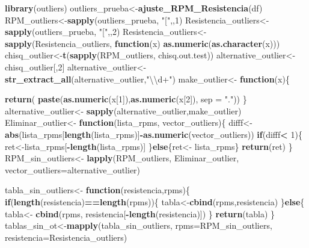 \documentclass[]{article}
\newenvironment{Shaded}{\begin{snugshade}}{\end{snugshade}}
\newcommand{\KeywordTok}[1]{\textcolor[rgb]{0.13,0.29,0.53}{\textbf{#1}}}
\newcommand{\DataTypeTok}[1]{\textcolor[rgb]{0.13,0.29,0.53}{#1}}
\newcommand{\DecValTok}[1]{\textcolor[rgb]{0.00,0.00,0.81}{#1}}
\newcommand{\CharTok}[1]{\textcolor[rgb]{0.31,0.60,0.02}{#1}}
\newcommand{\StringTok}[1]{\textcolor[rgb]{0.31,0.60,0.02}{#1}}
\newcommand{\ControlFlowTok}[1]{\textcolor[rgb]{0.13,0.29,0.53}{\textbf{#1}}}
\newcommand{\OperatorTok}[1]{\textcolor[rgb]{0.81,0.36,0.00}{\textbf{#1}}}
\newcommand{\NormalTok}[1]{#1}
\begin{document}
\begin{Shaded}
\begin{Highlighting}[]
\KeywordTok{library}\NormalTok{(outliers)}
\NormalTok{outliers_prueba<-}\KeywordTok{ajuste_RPM_Resistencia}\NormalTok{(df)}
\NormalTok{RPM_outliers<-}\KeywordTok{sapply}\NormalTok{(outliers_prueba, }\StringTok{"["}\NormalTok{,,}\DecValTok{1}\NormalTok{)}
\NormalTok{Resistencia_outliers<-}\KeywordTok{sapply}\NormalTok{(outliers_prueba, }\StringTok{"["}\NormalTok{,,}\DecValTok{2}\NormalTok{)}
\NormalTok{Resistencia_outliers<-}\KeywordTok{sapply}\NormalTok{(Resistencia_outliers, }\ControlFlowTok{function}\NormalTok{(x) }\KeywordTok{as.numeric}\NormalTok{(}\KeywordTok{as.character}\NormalTok{(x)))}
\NormalTok{chisq_outlier<-}\KeywordTok{t}\NormalTok{(}\KeywordTok{sapply}\NormalTok{(RPM_outliers, chisq.out.test))}
\NormalTok{alternative_outlier<-}\StringTok{ }\NormalTok{chisq_outlier[,}\DecValTok{2}\NormalTok{]}
\NormalTok{alternative_outlier<-}\KeywordTok{str_extract_all}\NormalTok{(alternative_outlier,}\StringTok{"}\CharTok{\textbackslash{}\textbackslash{}}\StringTok{d+"}\NormalTok{)}
\NormalTok{make_outlier<-}\StringTok{ }\ControlFlowTok{function}\NormalTok{(x)\{}
 
  \KeywordTok{return}\NormalTok{( }\KeywordTok{paste}\NormalTok{(}\KeywordTok{as.numeric}\NormalTok{(x[}\DecValTok{1}\NormalTok{]),}\KeywordTok{as.numeric}\NormalTok{(x[}\DecValTok{2}\NormalTok{]), }\DataTypeTok{sep =} \StringTok{"."}\NormalTok{))}
\NormalTok{\}}
\NormalTok{alternative_outlier<-}\StringTok{ }\KeywordTok{sapply}\NormalTok{(alternative_outlier,make_outlier)}
\NormalTok{Eliminar_outlier<-}\StringTok{ }\ControlFlowTok{function}\NormalTok{(lista_rpms, vector_outliers)\{}
\NormalTok{  difff<-}\StringTok{ }\KeywordTok{abs}\NormalTok{(lista_rpms[}\KeywordTok{length}\NormalTok{(lista_rpms)]}\OperatorTok{-}\KeywordTok{as.numeric}\NormalTok{(vector_outliers))}
\ControlFlowTok{if}\NormalTok{(difff}\OperatorTok{<}\StringTok{ }\DecValTok{1}\NormalTok{)\{}
\NormalTok{  ret<-lista_rpms[}\OperatorTok{-}\KeywordTok{length}\NormalTok{(lista_rpms)]}
\NormalTok{\}}\ControlFlowTok{else}\NormalTok{\{ret<-}\StringTok{ }\NormalTok{lista_rpms\}}
 \KeywordTok{return}\NormalTok{(ret) }
\NormalTok{\}}
\NormalTok{RPM_sin_outliers<-}\StringTok{ }\KeywordTok{lapply}\NormalTok{(RPM_outliers, Eliminar_outlier, }\DataTypeTok{vector_outliers=}\NormalTok{alternative_outlier)}

\NormalTok{tabla_sin_outliers<-}\StringTok{ }\ControlFlowTok{function}\NormalTok{(resistencia,rpms)\{}
  \ControlFlowTok{if}\NormalTok{(}\KeywordTok{length}\NormalTok{(resistencia)}\OperatorTok{==}\KeywordTok{length}\NormalTok{(rpms))\{}
\NormalTok{   tabla<-}\KeywordTok{cbind}\NormalTok{(rpms,resistencia)}
\NormalTok{  \}}\ControlFlowTok{else}\NormalTok{\{}
\NormalTok{    tabla<-}\StringTok{ }\KeywordTok{cbind}\NormalTok{(rpms, resistencia[}\OperatorTok{-}\KeywordTok{length}\NormalTok{(resistencia)])}
\NormalTok{  \}}
  \KeywordTok{return}\NormalTok{(tabla)}
\NormalTok{\}}
\NormalTok{tablas_sin_ot<-}\KeywordTok{mapply}\NormalTok{(tabla_sin_outliers, }\DataTypeTok{rpms=}\NormalTok{RPM_sin_outliers, }\DataTypeTok{resistencia=}\NormalTok{Resistencia_outliers)}


\end{Highlighting}
\end{Shaded}
\end{document}
